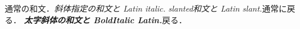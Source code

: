 \documentclass[pdflatex]{jlreq}
\begin{document}
通常の和文．{\itshape 斜体指定の和文と Latin italic.}
{\slshape slanted和文と Latin slant.}通常に戻る．
{\itshape\bfseries 太字斜体の和文と BoldItalic Latin.}戻る．
\end{document}
